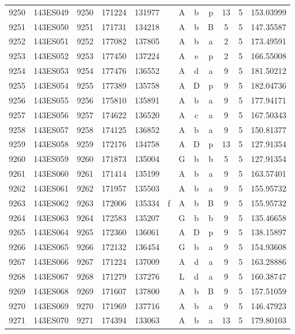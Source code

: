 \begin{tabular}{|*{12}{c|}}
9250 & 143ES049 & 9250 & 171224 & 131977 &  & A & b & p & 13 & 5 & 153.03999 \\ 
9251 & 143ES050 & 9251 & 171731 & 134218 &  & A & b & B & 5 & 5 & 147.35587 \\ 
9252 & 143ES051 & 9252 & 177082 & 137805 &  & A & b & a & 2 & 5 & 173.49591 \\ 
9253 & 143ES052 & 9253 & 177450 & 137224 &  & A & e & p & 2 & 5 & 166.55008 \\ 
9254 & 143ES053 & 9254 & 177476 & 136552 &  & A & d & a & 9 & 5 & 181.50212 \\ 
9255 & 143ES054 & 9255 & 177389 & 135758 &  & A & D & p & 9 & 5 & 182.04736 \\ 
9256 & 143ES055 & 9256 & 175810 & 135891 &  & A & b & a & 9 & 5 & 177.94171 \\ 
9257 & 143ES056 & 9257 & 174622 & 136520 &  & A & c & a & 9 & 5 & 167.50343 \\ 
9258 & 143ES057 & 9258 & 174125 & 136852 &  & A & b & a & 9 & 5 & 150.81377 \\ 
9259 & 143ES058 & 9259 & 172176 & 134758 &  & A & D & p & 13 & 5 & 127.91354 \\ 
9260 & 143ES059 & 9260 & 171873 & 135004 &  & G & b & b & 5 & 5 & 127.91354 \\ 
9261 & 143ES060 & 9261 & 171414 & 135199 &  & A & b & a & 9 & 5 & 163.57401 \\ 
9262 & 143ES061 & 9262 & 171957 & 135503 &  & A & b & a & 9 & 5 & 155.95732 \\ 
9263 & 143ES062 & 9263 & 172006 & 135334 & f & A & b & B & 9 & 5 & 155.95732 \\ 
9264 & 143ES063 & 9264 & 172583 & 135207 &  & G & b & b & 9 & 5 & 135.46658 \\ 
9265 & 143ES064 & 9265 & 172360 & 136061 &  & A & D & p & 9 & 5 & 138.15897 \\ 
9266 & 143ES065 & 9266 & 172132 & 136454 &  & G & b & a & 9 & 5 & 154.93608 \\ 
9267 & 143ES066 & 9267 & 171224 & 137009 &  & A & d & a & 9 & 5 & 163.28886 \\ 
9268 & 143ES067 & 9268 & 171279 & 137276 &  & L & d & a & 9 & 5 & 160.38747 \\ 
9269 & 143ES068 & 9269 & 171607 & 137800 &  & A & b & B & 9 & 5 & 157.51059 \\ 
9270 & 143ES069 & 9270 & 171969 & 137716 &  & A & b & a & 9 & 5 & 146.47923 \\ 
9271 & 143ES070 & 9271 & 174394 & 133063 &  & A & b & a & 13 & 5 & 179.80103 \\ 

\end{tabular}
